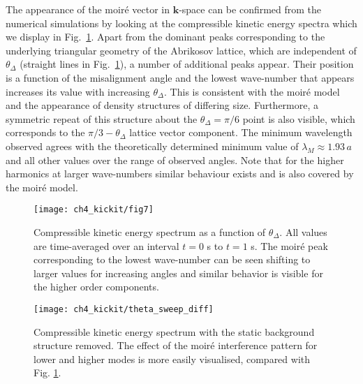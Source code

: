     The appearance of the moir\'e vector in $\mathbf{k}$-space can be confirmed from the numerical simulations by looking at the compressible kinetic energy spectra which we display in Fig.~\ref{fig:dtheta_kspec}. Apart from the dominant peaks corresponding to the underlying triangular geometry of the Abrikosov lattice, which are independent of $\theta_\Delta$ (straight lines in Fig.~\ref{fig:dtheta_kspec}), a number of additional peaks appear. Their position is a function of the misalignment angle and the lowest wave-number that appears increases its value with increasing $\theta_\Delta$. This is consistent with the moir\'e model and the appearance of density structures of differing size. Furthermore, a symmetric repeat of this structure about the $\theta_\Delta=\pi/6$ point is also visible, which corresponds to the $\pi/3 - \theta_\Delta$ lattice vector component. The minimum wavelength observed agrees with the theoretically determined minimum value of $\lambda_M\approx 1.93\,a$ and all other values over the range of observed angles. Note that for the higher harmonics at larger wave-numbers similar behaviour exists and is also covered by the moir\'e model.
	\begin{figure}[tb]
        \centering
		\texttt{[image: ch4\_kickit/fig7]}
		\caption[Compressible kinetic energy spectrum as a function of $\theta_\Delta$.]{Compressible kinetic energy spectrum as a function of $\theta_\Delta$. All values are time-averaged over an interval $t=0$ s to $t=1$ s. The moir\'e peak corresponding to the lowest wave-number can be seen shifting to larger values for increasing angles and similar behavior is visible for the higher order components.}
		\label{fig:dtheta_kspec}
	\end{figure}
    \begin{figure}[tb]
        \centering
        \texttt{[image: ch4\_kickit/theta\_sweep\_diff]}
        \caption[Compressible kinetic energy spectrum with the background structure removed.]{Compressible kinetic energy spectrum with the static background structure removed. The effect of the moir\'e interference pattern for lower and higher modes is more easily visualised, compared with Fig. \ref{fig:dtheta_kspec}.}
        \label{fig:dtheta_kspec_backg}
    \end{figure}

